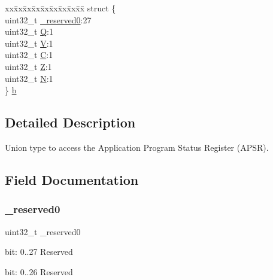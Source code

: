 \begin{DoxyCompactItemize}
\begin{tabbing}
\end{tabbing}\item 
\begin{tabbing}
xx\=xx\=xx\=xx\=xx\=xx\=xx\=xx\=xx\=\kill
struct \{\\
\>uint32\_t \mbox{\hyperlink{union_a_p_s_r___type_ac8a6a13838a897c8d0b8bc991bbaf7c1}{\_reserved0}}:27\\
\>uint32\_t \mbox{\hyperlink{union_a_p_s_r___type_a65f27ddc4f7e09c14ce7c5211b2e000a}{Q}}:1\\
\>uint32\_t \mbox{\hyperlink{union_a_p_s_r___type_acd4a2b64faee91e4a9eef300667fa222}{V}}:1\\
\>uint32\_t \mbox{\hyperlink{union_a_p_s_r___type_a7a1caf92f32fe9ebd8d1fe89b06c7776}{C}}:1\\
\>uint32\_t \mbox{\hyperlink{union_a_p_s_r___type_a5ae954cbd9986cd64625d7fa00943c8e}{Z}}:1\\
\>uint32\_t \mbox{\hyperlink{union_a_p_s_r___type_abae0610bc2a97bbf7f689e953e0b451f}{N}}:1\\
\} \mbox{\hyperlink{union_a_p_s_r___type_ac7f3bcfa917f29ae98a10b199395ff9d}{b}}\\

\end{tabbing}\end{DoxyCompactItemize}


\subsection{Detailed Description}
Union type to access the Application Program Status Register (A\+P\+SR). 

\subsection{Field Documentation}
\mbox{\label{union_a_p_s_r___type_ac8a6a13838a897c8d0b8bc991bbaf7c1}} 
\subsubsection{\texorpdfstring{\+\_\+reserved0}{\_reserved0}}
{\footnotesize\ttfamily uint32\+\_\+t \+\_\+reserved0}

bit\+: 0..27 Reserved

bit\+: 0..26 Reserved

